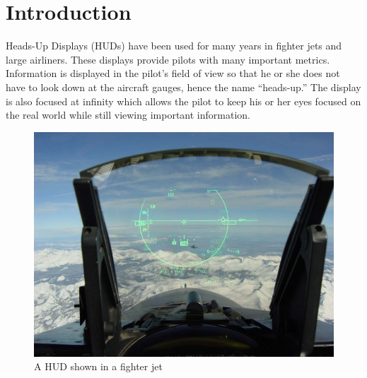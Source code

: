 \chapter{Introduction}




Heads-Up Displays (HUDs) have been used for many years in fighter jets and
large airliners. These displays provide pilots with many important metrics.
Information is displayed in the pilot's field of view so that he or she
does not have to look down at the aircraft gauges, hence the name
``heads-up.'' The display is also focused at infinity which
allows the pilot to keep his or her eyes focused on the real world while
still viewing important information.

\begin{figure}[h]
\includegraphics[width=\textwidth]{img/JetHUD.jpg}
\caption{A HUD shown in a fighter jet}
\label{fig:jetHUD}
\end{figure}


